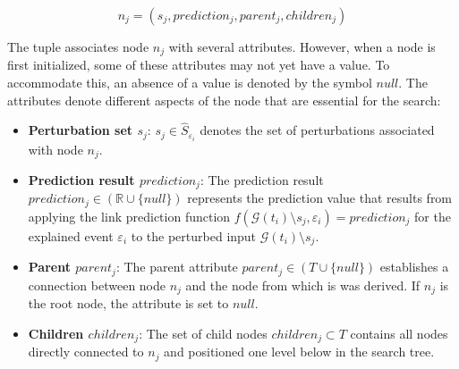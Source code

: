 \begin{equation}
    \label{e_search_tree_simple}
    n_j = (s_j, prediction_j, parent_j, children_j)
\end{equation}

The tuple associates node $n_j$ with several attributes. However, when a node is first initialized, some of these attributes may not yet have a value. To accommodate this, an absence of a value is denoted by the symbol $null$. The attributes denote different aspects of the node that are essential for the search:


\begin{itemize}
    \item \textbf{Perturbation set $s_j$}: $s_j \in \hat{S}_{\varepsilon_i}$ denotes the set of perturbations associated with node $n_j$.

    \item \textbf{Prediction result $prediction_j$}: The prediction result $prediction_j \in (\mathbb{R} \cup \{null\})$ represents the prediction value that results from applying the link prediction function $f(\mathcal{G}(t_i) \setminus s_j, \varepsilon_i) = prediction_j$ for the explained event $\varepsilon_i$ to the perturbed input $\mathcal{G}(t_i) \setminus s_j$.

    \item \textbf{Parent $parent_j$}: The parent attribute $parent_j \in (T \cup \{null\})$ establishes a connection between node $n_j$ and the node from which is was derived. If $n_j$ is the root node, the attribute is set to $null$.

    \item \textbf{Children $children_j$}: The set of child nodes $children_j \subset T$ contains all nodes directly connected to $n_j$ and positioned one level below in the search tree.



\end{itemize}

